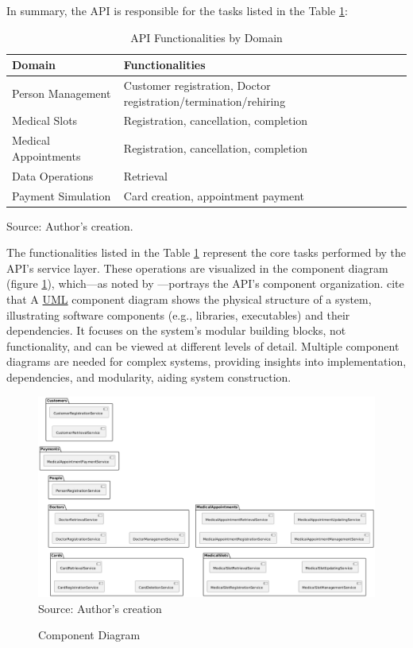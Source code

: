 In summary, the API is responsible for the tasks listed in the Table \ref{api_functionalities_grouped}:

\begin{table}[H]
\centering
\caption{API Functionalities by Domain}
\label{api_functionalities_grouped}
\begin{tabular}{p{}p{}}
\toprule
\textbf{Domain} & \textbf{Functionalities} \\
\midrule
Person Management & Customer registration, Doctor registration/termination/rehiring \\ \hline
Medical Slots & Registration, cancellation, completion \\ \hline
Medical Appointments & Registration, cancellation, completion \\ \hline
Data Operations & Retrieval \\ \hline
Payment Simulation & Card creation, appointment payment \\
\bottomrule
\end{tabular}
\footnotesize Source: Author's creation.
\end{table}

The functionalities listed in the Table 
\ref{api_functionalities_grouped} represent the core tasks performed by the API's service layer. These operations are visualized in the component diagram (figure \ref{fig:component_diagram}), which—as noted by \cite{rajagopal2017study}—portrays the API's component organization. \cite{bell2003uml, rajput2015uml} cite that A \hyperref[appendix:glossary]{UML} component diagram shows the physical structure of a system, illustrating software components (e.g., libraries, executables) and their dependencies. It focuses on the system's modular building blocks, not functionality, and can be viewed at different levels of detail. Multiple component diagrams are needed for complex systems, providing insights into implementation, dependencies, and modularity, aiding system construction.

\begin{landscape}
\begin{figure}[H]
    \centering
    \caption{Component Diagram}
    \includegraphics[width=0.99\linewidth]{figures/component_diagram.png}
    \label{fig:component_diagram}
    \\ \footnotesize Source: Author's creation
\end{figure}
\end{landscape}

